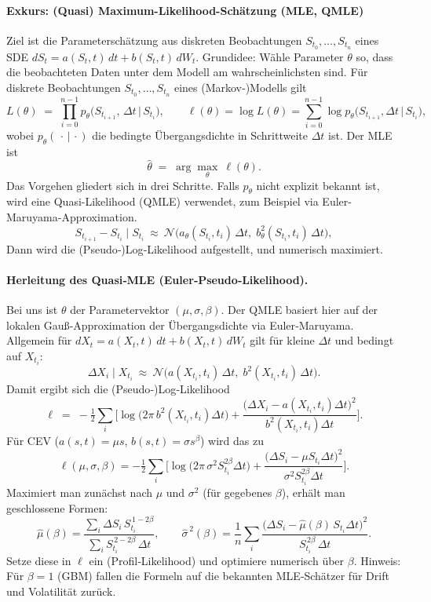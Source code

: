 \paragraph{Exkurs: (Quasi) Maximum-Likelihood-Schätzung (MLE, QMLE)}
Ziel ist die Parameterschätzung aus diskreten Beobachtungen $S_{t_0},\dots,S_{t_n}$ eines SDE
$dS_t=a(S_t,t)\,dt+b(S_t,t)\,dW_t$. Grundidee: Wähle Parameter $\theta$ so, dass die beobachteten Daten unter dem Modell am wahrscheinlichsten sind. Für diskrete Beobachtungen $S_{t_0},\dots,S_{t_n}$ eines (Markov‑)Modells gilt
$$
L(\theta) \;=\; \prod_{i=0}^{n-1} p_\theta\!\big(S_{t_{i+1}},\,\Delta t \,\big|\, S_{t_i}\big), 
\qquad
\ell(\theta)=\log L(\theta)=\sum_{i=0}^{n-1}\log p_\theta\!\big(S_{t_{i+1}},\Delta t \,\big|\, S_{t_i}\big),
$$
wobei $p_\theta(\,\cdot\,|\,\cdot)$ die bedingte Übergangsdichte in Schrittweite $\Delta t$ ist. Der MLE ist
$$
\widehat\theta\;=\;\arg\max_{\theta}\ \ell(\theta).
$$
Das Vorgehen gliedert sich in drei Schritte. Falls $p_\theta$ nicht explizit bekannt ist, wird eine Quasi-Likelihood (QMLE) verwendet, zum Beispiel via Euler-Maruyama-Approximation.
$$
S_{t_{i+1}}-S_{t_i}\mid S_{t_i}\ \approx\ \mathcal N\!\big(a_\theta(S_{t_i},t_i)\,\Delta t,\; b_\theta^2(S_{t_i},t_i)\,\Delta t\big),
$$
Dann wird die (Pseudo‑)Log‑Likelihood aufgestellt, und numerisch maximiert.

\paragraph{Herleitung des Quasi‑MLE (Euler‑Pseudo‑Likelihood).}
Bei uns ist $\theta$ der Parametervektor $(\mu,\sigma,\beta)$. Der QMLE basiert hier auf der lokalen Gauß‑Approximation der Übergangsdichte via Euler‑Maruyama. Allgemein für
$dX_t=a(X_t,t)\,dt+b(X_t,t)\,dW_t$ gilt für kleine $\Delta t$ und bedingt auf $X_{t_i}$:
$$
\Delta X_i \mid X_{t_i}\ \approx\ \mathcal N\!\big(a(X_{t_i},t_i)\,\Delta t,\; b^2(X_{t_i},t_i)\,\Delta t\big).
$$
Damit ergibt sich die (Pseudo‑)Log‑Likelihood
$$
\ell \;=\; -\tfrac12\sum_i \Big[
\log\!\big(2\pi\,b^2(X_{t_i},t_i)\Delta t\big)
+\frac{\big(\Delta X_i-a(X_{t_i},t_i)\Delta t\big)^2}{b^2(X_{t_i},t_i)\Delta t}
\Big].
$$
Für CEV ($a(s,t)=\mu s$, $b(s,t)=\sigma s^{\beta}$) wird das zu
$$
\ell(\mu,\sigma,\beta)
= -\tfrac12\sum_i\Big[
\log\!\big(2\pi\,\sigma^2 S_{t_i}^{2\beta}\Delta t\big)
+\frac{\big(\Delta S_i-\mu S_{t_i}\Delta t\big)^2}{\sigma^2 S_{t_i}^{2\beta}\Delta t}
\Big].
$$
Maximiert man zunächst nach $\mu$ und $\sigma^2$ (für gegebenes $\beta$), erhält man geschlossene Formen:
$$
\widehat{\mu}(\beta)
= \frac{\sum_i \Delta S_i\, S_{t_i}^{\,1-2\beta}}{\sum_i S_{t_i}^{\,2-2\beta}\,\Delta t},
\qquad
\widehat{\sigma}^{\,2}(\beta)
= \frac{1}{n}\sum_i \frac{\big(\Delta S_i-\widehat{\mu}(\beta)\,S_{t_i}\Delta t\big)^2}{S_{t_i}^{\,2\beta}\,\Delta t}.
$$
Setze diese in $\ell$ ein (Profil‑Likelihood) und optimiere numerisch über $\beta$.
Hinweis: Für $\beta=1$ (GBM) fallen die Formeln auf die bekannten MLE‑Schätzer für Drift und Volatilität zurück.

